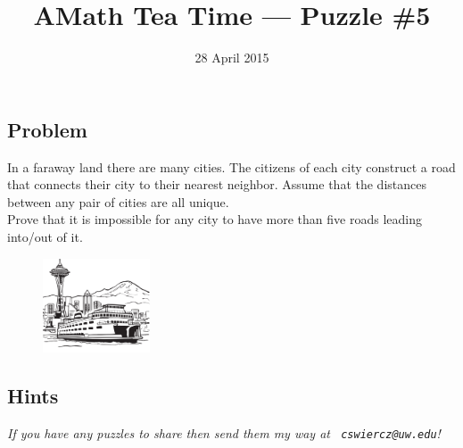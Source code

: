 \documentclass[12pt]{article}
\title{AMath Tea Time --- Puzzle \#5}
\author{}
\date{\vspace{-1cm}28 April 2015}
\begin{document}
\maketitle
{}

\subsection*{Problem}

\noindent In a faraway land there are many cities.  The citizens of each city
construct a road that connects their city to their nearest neighbor.  Assume
that the distances between any pair of cities are all unique. \\

\noindent Prove that it is impossible for any city to have more than five roads
leading into/out of it.

\begin{figure}[ht]
  \centering
  \includegraphics[width=120px]{seattle.png}
\end{figure}


\subsection*{Hints}




{
\par\vspace*{\fill}
\noindent \small \it
If you have any puzzles to share then send them my way at {\tt
  cswiercz@uw.edu}!
}
\end{document}
